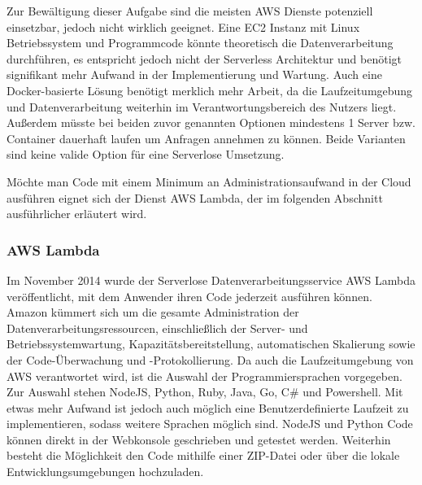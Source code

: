 {Zur Bewältigung dieser Aufgabe sind die meisten AWS Dienste potenziell einsetzbar, jedoch nicht wirklich geeignet.
Eine EC2 Instanz mit Linux Betriebssystem und Programmcode könnte theoretisch die Datenverarbeitung durchführen, es entspricht jedoch nicht der Serverless Architektur und benötigt signifikant mehr Aufwand in der Implementierung und Wartung.
Auch eine Docker-basierte Lösung benötigt merklich mehr Arbeit, da die Laufzeitumgebung und Datenverarbeitung weiterhin im Verantwortungsbereich des Nutzers liegt.
Außerdem müsste bei beiden zuvor genannten Optionen mindestens 1 Server bzw. Container dauerhaft laufen um Anfragen annehmen zu können. Beide Varianten sind keine valide Option für eine Serverlose Umsetzung.

Möchte man Code mit einem Minimum an Administrationsaufwand in der Cloud ausführen eignet sich der Dienst AWS Lambda, der im folgenden Abschnitt ausführlicher erläutert wird.

\subsubsection{AWS Lambda}
Im November 2014 wurde der Serverlose Datenverarbeitungsservice AWS Lambda veröffentlicht, mit dem Anwender ihren Code jederzeit ausführen können.
Amazon kümmert sich um die \glqq gesamte Administration der Datenverarbeitungsressourcen, einschließlich der Server- und Betriebssystemwartung, Kapazitätsbereitstellung, automatischen Skalierung sowie der Code-Überwachung und -Protokollierung.\grqq{} \cite[]{LambdaZitat}
Da auch die Laufzeitumgebung von AWS verantwortet wird, ist die Auswahl der Programmiersprachen vorgegeben. Zur Auswahl stehen NodeJS, Python, Ruby, Java, Go, C\# und Powershell.
Mit etwas mehr Aufwand ist jedoch auch möglich eine Benutzerdefinierte Laufzeit zu implementieren, sodass weitere Sprachen möglich sind.
NodeJS und Python Code können direkt in der Webkonsole geschrieben und getestet werden.
Weiterhin besteht die Möglichkeit den Code mithilfe einer ZIP-Datei oder über die lokale Entwicklungsumgebungen hochzuladen.


}
